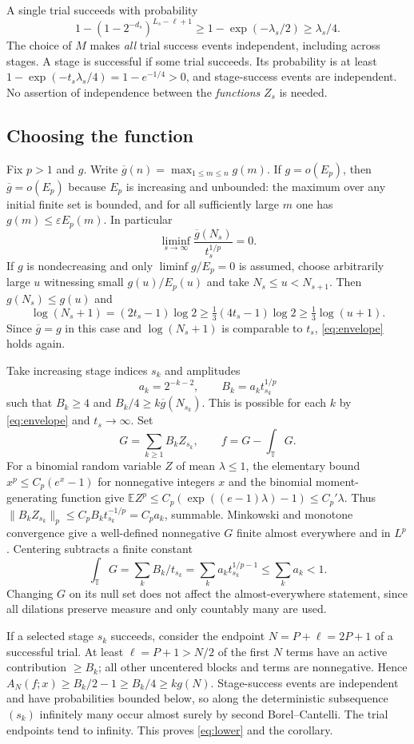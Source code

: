 \documentclass[11pt]{article}
\newcommand{\T}{\mathbb T}
\newcommand{\E}{\mathbb E}
\begin{document}
A single trial succeeds with probability
\[
 1-(1-2^{-d_s})^{L_s-\ell+1}
 \ge 1-\exp(-\lambda_s/2)\ge \lambda_s/4 .
\]
The choice of $M$ makes \emph{all} trial success events independent, including across stages. A stage is successful if some trial succeeds. Its probability is at least $1-\exp(-t_s\lambda_s/4)=1-e^{-1/4}>0$, and stage-success events are independent. No assertion of independence between the \emph{functions} $Z_s$ is needed.

\subsection*{Choosing the function}
Fix $p>1$ and $g$. Write $\overline g(n)=\max_{1\le m\le n}g(m)$. If $g=o(E_p)$, then $\overline g=o(E_p)$ because $E_p$ is increasing and unbounded: the maximum over any initial finite set is bounded, and for all sufficiently large $m$ one has $g(m)\le\varepsilon E_p(m)$. In particular
\[
 \liminf_{s\to\infty}\frac{\overline g(N_s)}{t_s^{1/p}}=0 .
 \tag{6}\label{eq:envelope}
\]
If $g$ is nondecreasing and only $\liminf g/E_p=0$ is assumed, choose arbitrarily large $u$ witnessing small $g(u)/E_p(u)$ and take $N_s\le u<N_{s+1}$. Then $g(N_s)\le g(u)$ and
\[
 \log(N_s+1)=(2t_s-1)\log 2
 \ge \tfrac13(4t_s-1)\log 2
 \ge \tfrac13\log(u+1).
\]
Since $\overline g=g$ in this case and $\log(N_s+1)$ is comparable to $t_s$, \eqref{eq:envelope} holds again.

Take increasing stage indices $s_k$ and amplitudes
\[
 a_k=2^{-k-2}, \qquad B_k=a_k t_{s_k}^{1/p}
\]
such that $B_k\ge4$ and $B_k/4\ge k\overline g(N_{s_k})$. This is possible for each $k$ by \eqref{eq:envelope} and $t_s\to\infty$. Set
\[
 G=\sum_{k\ge1} B_k Z_{s_k},\qquad f=G-\int_\T G .
\]
For a binomial random variable $Z$ of mean $\lambda\le1$, the elementary bound $x^p\le C_p(e^x-1)$ for nonnegative integers $x$ and the binomial moment-generating function give
$\E Z^p\le C_p(\exp((e-1)\lambda)-1)\le C_p'\lambda$.
Thus $\|B_k Z_{s_k}\|_p\le C_pB_k t_{s_k}^{-1/p}=C_p a_k$, summable. Minkowski and monotone convergence give a well-defined nonnegative $G$ finite almost everywhere and in $L^p$. Centering subtracts a finite constant
\[
 \int_\T G=\sum_k B_k/t_{s_k}
   =\sum_k a_k t_{s_k}^{1/p-1}\le\sum_k a_k<1.
\]
Changing $G$ on its null set does not affect the almost-everywhere statement, since all dilations preserve measure and only countably many are used.

If a selected stage $s_k$ succeeds, consider the endpoint $N=P+\ell=2P+1$ of a successful trial. At least $\ell=P+1>N/2$ of the first $N$ terms have an active contribution $\ge B_k$; all other uncentered blocks and terms are nonnegative. Hence $A_N(f;x)\ge B_k/2-1\ge B_k/4\ge k g(N)$. Stage-success events are independent and have probabilities bounded below, so along the deterministic subsequence $(s_k)$ infinitely many occur almost surely by second Borel--Cantelli. The trial endpoints tend to infinity. This proves \eqref{eq:lower} and the corollary.
\end{document}
